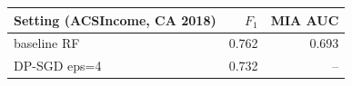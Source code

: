 \begin{tabular}{lrr}
\toprule
Setting (ACSIncome, CA 2018) & $F_1$ & MIA AUC \\
\midrule
baseline RF & 0.762 & 0.693 \\
DP-SGD eps=4 & 0.732 & -- \\
\bottomrule
\end{tabular}
